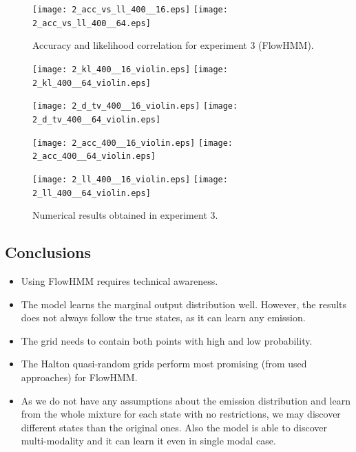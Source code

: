 \documentclass[shortabstract]{iithesis}
\begin{document}
\begin{figure}
    \centering
    \texttt{[image: 2\_acc\_vs\_ll\_400\_\_16.eps]}
    \texttt{[image: 2\_acc\_vs\_ll\_400\_\_64.eps]}
    \caption{Accuracy and likelihood correlation for experiment 3 (FlowHMM).}
    \label{fig:res_vs}
\end{figure}

\newpage

\begin{figure}
    \centering
    \texttt{[image: 2\_kl\_400\_\_16\_violin.eps]}
    \texttt{[image: 2\_kl\_400\_\_64\_violin.eps]}
    
    \texttt{[image: 2\_d\_tv\_400\_\_16\_violin.eps]}
    \texttt{[image: 2\_d\_tv\_400\_\_64\_violin.eps]}
    
    \texttt{[image: 2\_acc\_400\_\_16\_violin.eps]}
    \texttt{[image: 2\_acc\_400\_\_64\_violin.eps]}
    
    \texttt{[image: 2\_ll\_400\_\_16\_violin.eps]}
    \texttt{[image: 2\_ll\_400\_\_64\_violin.eps]}
    \caption{Numerical results obtained in experiment 3.}
    \label{fig:ex3_results}
\end{figure}


\newpage

\subsection{Conclusions}



\begin{itemize}
    \item Using FlowHMM requires technical awareness. 
    \item The model learns the marginal output distribution well. However, the results does not always follow the true states, as it can learn any emission.
    \item The grid needs to contain both points with high and low probability.
    \item The Halton quasi-random grids perform most promising (from used approaches) for FlowHMM. 
    \item As we do not have any assumptions about the emission distribution and learn from the whole mixture for each state with no restrictions, we may discover different states than the original ones. Also the model is able to discover multi-modality and it can learn it even in single modal case. 
\end{itemize}
\end{document}
